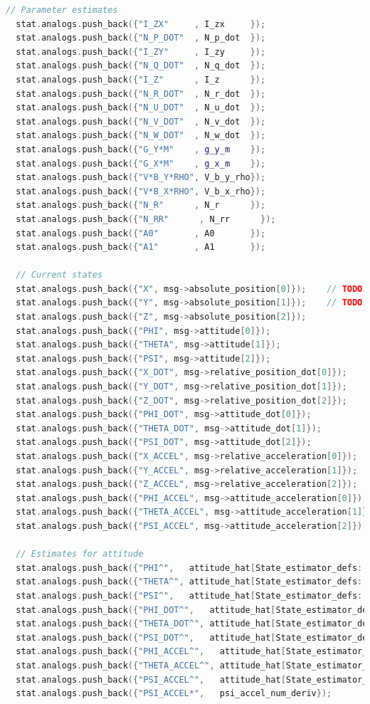 \documentclass[applsci,article,submit,pdftex,moreauthors]{Definitions/mdpi}
\begin{document}
\begin{lstlisting}[language=c++]
  // Parameter estimates
  stat.analogs.push_back({"I_ZX"     , I_zx     });
  stat.analogs.push_back({"N_P_DOT"  , N_p_dot  });
  stat.analogs.push_back({"I_ZY"     , I_zy     });
  stat.analogs.push_back({"N_Q_DOT"  , N_q_dot  });
  stat.analogs.push_back({"I_Z"      , I_z      });
  stat.analogs.push_back({"N_R_DOT"  , N_r_dot  });
  stat.analogs.push_back({"N_U_DOT"  , N_u_dot  });
  stat.analogs.push_back({"N_V_DOT"  , N_v_dot  });
  stat.analogs.push_back({"N_W_DOT"  , N_w_dot  });
  stat.analogs.push_back({"G_Y*M"    , g_y_m    });
  stat.analogs.push_back({"G_X*M"    , g_x_m    });
  stat.analogs.push_back({"V*B_Y*RHO", V_b_y_rho});
  stat.analogs.push_back({"V*B_X*RHO", V_b_x_rho});
  stat.analogs.push_back({"N_R"      , N_r      });
  stat.analogs.push_back({"N_RR"      , N_rr      });
  stat.analogs.push_back({"A0"       , A0       });
  stat.analogs.push_back({"A1"       , A1       });

  // Current states
  stat.analogs.push_back({"X", msg->absolute_position[0]});    // TODO: what is the correct "X" state? Meters North of setpoint?
  stat.analogs.push_back({"Y", msg->absolute_position[1]});    // TODO: what is the correct "Y" state? Meters East of setpoint?
  stat.analogs.push_back({"Z", msg->absolute_position[2]});
  stat.analogs.push_back({"PHI", msg->attitude[0]});
  stat.analogs.push_back({"THETA", msg->attitude[1]});
  stat.analogs.push_back({"PSI", msg->attitude[2]});
  stat.analogs.push_back({"X_DOT", msg->relative_position_dot[0]});
  stat.analogs.push_back({"Y_DOT", msg->relative_position_dot[1]});
  stat.analogs.push_back({"Z_DOT", msg->relative_position_dot[2]});
  stat.analogs.push_back({"PHI_DOT", msg->attitude_dot[0]});
  stat.analogs.push_back({"THETA_DOT", msg->attitude_dot[1]});
  stat.analogs.push_back({"PSI_DOT", msg->attitude_dot[2]});
  stat.analogs.push_back({"X_ACCEL", msg->relative_acceleration[0]});
  stat.analogs.push_back({"Y_ACCEL", msg->relative_acceleration[1]});
  stat.analogs.push_back({"Z_ACCEL", msg->relative_acceleration[2]});
  stat.analogs.push_back({"PHI_ACCEL", msg->attitude_acceleration[0]});
  stat.analogs.push_back({"THETA_ACCEL", msg->attitude_acceleration[1]});
  stat.analogs.push_back({"PSI_ACCEL", msg->attitude_acceleration[2]});

  // Estimates for attitude
  stat.analogs.push_back({"PHI^",   attitude_hat[State_estimator_defs::Phi]});
  stat.analogs.push_back({"THETA^", attitude_hat[State_estimator_defs::Theta]});
  stat.analogs.push_back({"PSI^",   attitude_hat[State_estimator_defs::Psi]});
  stat.analogs.push_back({"PHI_DOT^",   attitude_hat[State_estimator_defs::Phi_dot]});
  stat.analogs.push_back({"THETA_DOT^", attitude_hat[State_estimator_defs::Theta_dot]});
  stat.analogs.push_back({"PSI_DOT^",   attitude_hat[State_estimator_defs::Psi_dot]});
  stat.analogs.push_back({"PHI_ACCEL^",   attitude_hat[State_estimator_defs::Phi_accel]});
  stat.analogs.push_back({"THETA_ACCEL^", attitude_hat[State_estimator_defs::Theta_accel]});
  stat.analogs.push_back({"PSI_ACCEL^",   attitude_hat[State_estimator_defs::Psi_accel]});
  stat.analogs.push_back({"PSI_ACCEL*",   psi_accel_num_deriv});


\end{lstlisting}
\end{document}
